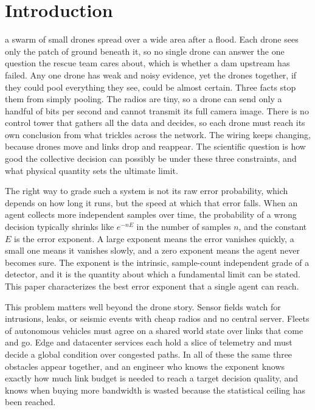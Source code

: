 \documentclass[journal]{IEEEtran}
\theoremstyle{definition}
\theoremstyle{remark}
\begin{document}
\section{Introduction}\label{sec:intro}
 a swarm of small drones spread over a wide area after a flood. Each drone sees only the
patch of ground beneath it, so no single drone can answer the one question the rescue team cares about, which is
whether a dam upstream has failed. Any one drone has weak and noisy evidence, yet the drones together, if they
could pool everything they see, could be almost certain. Three facts stop them from simply pooling. The radios
are tiny, so a drone can send only a handful of bits per second and cannot transmit its full camera image. There
is no control tower that gathers all the data and decides, so each drone must reach its own conclusion from what
trickles across the network. The wiring keeps changing, because drones move and links drop and reappear. The
scientific question is how good the collective decision can possibly be under these three constraints, and what
physical quantity sets the ultimate limit.

The right way to grade such a system is not its raw error probability, which depends on how long it runs, but the
speed at which that error falls. When an agent collects more independent samples over time, the probability of a
wrong decision typically shrinks like $e^{-nE}$ in the number of samples $n$, and the constant $E$ is the error
exponent. A large exponent means the error vanishes quickly, a small one means it vanishes slowly, and a zero
exponent means the agent never becomes sure. The exponent is the intrinsic, sample-count
independent grade of a detector, and it is the quantity about which a fundamental limit can be stated. This paper
characterizes the best error exponent that a single agent can reach.

This problem matters well beyond the drone story. Sensor fields watch for intrusions, leaks, or seismic events
with cheap radios and no central server. Fleets of autonomous vehicles must agree on a shared world state over
links that come and go. Edge and datacenter services each hold a slice of telemetry and must decide a global
condition over congested paths. In all of these the same three obstacles appear together, and an engineer who
knows the exponent knows exactly how much link budget is needed to reach a target decision quality, and knows
when buying more bandwidth is wasted because the statistical ceiling has been reached.
\end{document}
